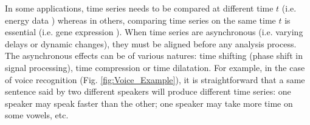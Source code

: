  In some applications, time series needs to be compared at different time $t$ (i.e. energy data \cite{Najmeddine2012}) whereas in others, comparing time series on the same time $t$ is essential (i.e. gene expression \cite{Chouakria2007}). When time series are asynchronous (i.e. varying delays or dynamic changes), they must be aligned before any analysis process. The asynchronous effects can be of various natures: time shifting (phase shift in signal processing), time compression or time dilatation. For example, in the case of voice recognition (Fig. \ref{fig:Voice_Example}), it is straightforward that a same sentence said by two different speakers will produce different time series: one speaker may speak faster than the other; one speaker may take more time on some vowels, etc.

